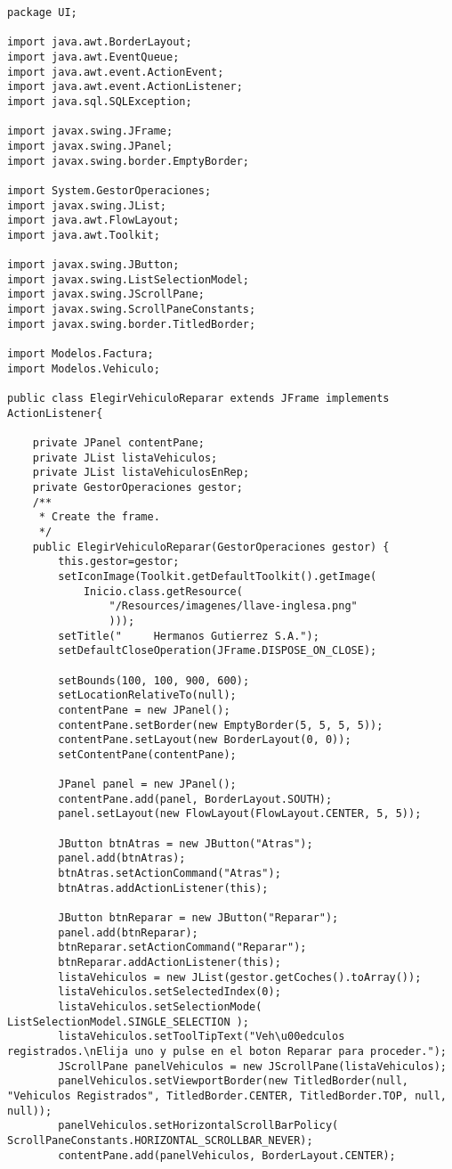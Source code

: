 \begin{lstlisting}[caption=ElegirVehiculoReparar.java (App Escritorio)]
package UI;

import java.awt.BorderLayout;
import java.awt.EventQueue;
import java.awt.event.ActionEvent;
import java.awt.event.ActionListener;
import java.sql.SQLException;

import javax.swing.JFrame;
import javax.swing.JPanel;
import javax.swing.border.EmptyBorder;

import System.GestorOperaciones;
import javax.swing.JList;
import java.awt.FlowLayout;
import java.awt.Toolkit;

import javax.swing.JButton;
import javax.swing.ListSelectionModel;
import javax.swing.JScrollPane;
import javax.swing.ScrollPaneConstants;
import javax.swing.border.TitledBorder;

import Modelos.Factura;
import Modelos.Vehiculo;

public class ElegirVehiculoReparar extends JFrame implements ActionListener{

	private JPanel contentPane;
	private JList listaVehiculos;
	private JList listaVehiculosEnRep;
	private GestorOperaciones gestor;
	/**
	 * Create the frame.
	 */
	public ElegirVehiculoReparar(GestorOperaciones gestor) {
		this.gestor=gestor;
		setIconImage(Toolkit.getDefaultToolkit().getImage(
            Inicio.class.getResource( 
                "/Resources/imagenes/llave-inglesa.png" 
                )));
		setTitle("     Hermanos Gutierrez S.A.");
		setDefaultCloseOperation(JFrame.DISPOSE_ON_CLOSE);
		
		setBounds(100, 100, 900, 600);
		setLocationRelativeTo(null);
		contentPane = new JPanel();
		contentPane.setBorder(new EmptyBorder(5, 5, 5, 5));
		contentPane.setLayout(new BorderLayout(0, 0));
		setContentPane(contentPane);
		
		JPanel panel = new JPanel();
		contentPane.add(panel, BorderLayout.SOUTH);
		panel.setLayout(new FlowLayout(FlowLayout.CENTER, 5, 5));
		
		JButton btnAtras = new JButton("Atras");
		panel.add(btnAtras);
		btnAtras.setActionCommand("Atras");
		btnAtras.addActionListener(this);
		
		JButton btnReparar = new JButton("Reparar");
		panel.add(btnReparar);
		btnReparar.setActionCommand("Reparar");
		btnReparar.addActionListener(this);
		listaVehiculos = new JList(gestor.getCoches().toArray());
		listaVehiculos.setSelectedIndex(0);
		listaVehiculos.setSelectionMode( ListSelectionModel.SINGLE_SELECTION );
		listaVehiculos.setToolTipText("Veh\u00edculos registrados.\nElija uno y pulse en el boton Reparar para proceder.");
		JScrollPane panelVehiculos = new JScrollPane(listaVehiculos);
		panelVehiculos.setViewportBorder(new TitledBorder(null, "Vehiculos Registrados", TitledBorder.CENTER, TitledBorder.TOP, null, null));
		panelVehiculos.setHorizontalScrollBarPolicy( ScrollPaneConstants.HORIZONTAL_SCROLLBAR_NEVER);
		contentPane.add(panelVehiculos, BorderLayout.CENTER);
		

\end{lstlisting}
